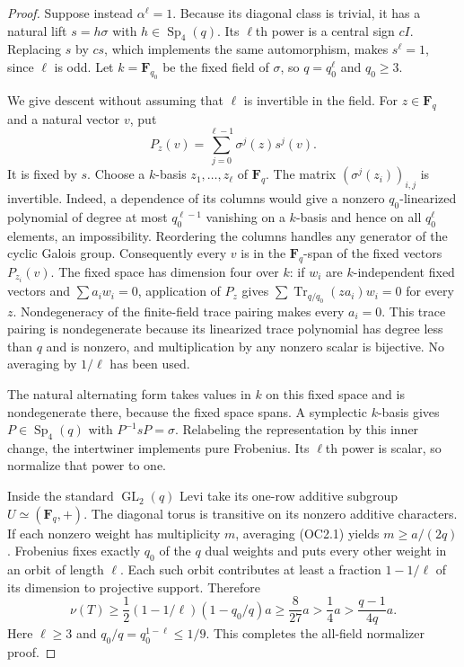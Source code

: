 \begin{proof}
Suppose instead $\alpha^\ell=1$. Because its diagonal class is
trivial, it has a natural lift $s=h\sigma$ with
$h\in\operatorname{Sp}_4(q)$. Its $\ell$th power is a central
sign $cI$. Replacing $s$ by $cs$, which implements the same
automorphism, makes $s^\ell=1$, since $\ell$ is odd. Let
$k=\mathbf F_{q_0}$ be the fixed field of $\sigma$, so
$q=q_0^\ell$ and $q_0\ge3$.

We give descent without assuming that $\ell$ is invertible in
the field. For $z\in\mathbf F_q$ and a natural vector $v$, put
\[
             P_z(v)=\sum_{j=0}^{\ell-1}\sigma^j(z)s^j(v).
                                                               \tag{OC2.13}
\]
It is fixed by $s$. Choose a $k$-basis $z_1,\ldots,z_\ell$
of $\mathbf F_q$. The matrix $(\sigma^j(z_i))_{i,j}$ is
invertible. Indeed, a dependence of its columns would give
a nonzero $q_0$-linearized polynomial of degree at most
$q_0^{\ell-1}$ vanishing on a $k$-basis and hence on all
$q_0^\ell$ elements, an impossibility. Reordering the columns
handles any generator of the cyclic Galois group. Consequently
every $v$ is in the $\mathbf F_q$-span of the fixed vectors
$P_{z_i}(v)$. The fixed space has dimension four over $k$:
if $w_i$ are $k$-independent fixed vectors and
$\sum a_iw_i=0$, application of $P_z$ gives
$\sum\operatorname{Tr}_{q/q_0}(za_i)w_i=0$ for every $z$.
Nondegeneracy of the finite-field trace pairing makes every
$a_i=0$. This trace pairing is nondegenerate because its
linearized trace polynomial has degree less than $q$ and
is nonzero, and multiplication by any nonzero scalar is
bijective. No averaging by $1/\ell$ has been used.

The natural alternating form takes values in $k$ on this
fixed space and is nondegenerate there, because the fixed
space spans. A symplectic $k$-basis gives
$P\in\operatorname{Sp}_4(q)$ with $P^{-1}sP=\sigma$.
Relabeling the representation by this inner change, the
intertwiner implements pure Frobenius. Its $\ell$th power is
scalar, so normalize that power to one.

Inside the standard $\operatorname{GL}_2(q)$ Levi take its
one-row additive subgroup $U\simeq(\mathbf F_q,+)$.
The diagonal torus is transitive on its nonzero additive
characters. If each nonzero weight has multiplicity $m$,
averaging (OC2.1) yields $m\ge a/(2q)$. Frobenius fixes
exactly $q_0$ of the $q$ dual weights and puts every other
weight in an orbit of length $\ell$. Each such orbit
contributes at least a fraction $1-1/\ell$ of its dimension
to projective support. Therefore
\[
 \nu(T)\ge\frac12(1-1/\ell)(1-q_0/q)a
       \ge\frac8{27}a>\frac14a
       >\frac{q-1}{4q}a.                                    \tag{OC2.14}
\]
Here $\ell\ge3$ and $q_0/q=q_0^{1-\ell}\le1/9$.
This completes the all-field normalizer proof.
\end{proof}

